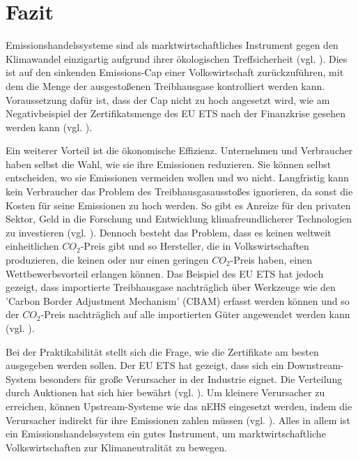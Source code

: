 \chapter{Fazit}

Emissionshandelssysteme sind als marktwirtschaftliches Instrument gegen den Klimawandel einzigartig aufgrund ihrer ökologischen Treffsicherheit (vgl. \cite[S. 182]{hubert.2020}).
Dies ist auf den sinkenden Emissions-Cap einer Volkswirtschaft zurückzuführen, mit dem die Menge der ausgestoßenen Treibhausgase kontrolliert werden kann.
Voraussetzung dafür ist, dass der Cap nicht zu hoch angesetzt wird, wie am Negativbeispiel der Zertifikatsmenge des EU ETS nach der Finanzkrise gesehen werden kann (vgl. \cite{eu3.2023}).

Ein weiterer Vorteil ist die ökonomische Effizienz. Unternehmen und Verbraucher haben selbst die Wahl, wie sie ihre Emissionen reduzieren.
Sie können selbst entscheiden, wo sie Emissionen vermeiden wollen und wo nicht. Langfristig kann kein Verbraucher das Problem des Treibhausgasausstoßes ignorieren, da sonst die Kosten für seine Emissionen zu hoch werden.
So gibt es Anreize für den privaten Sektor, Geld in die Forschung und Entwicklung klimafreundlicherer Technologien zu investieren (vgl. \cite[S. 183]{hubert.2020}).
Dennoch besteht das Problem, dass es keinen weltweit einheitlichen $CO_2$-Preis gibt und so Hersteller, die in Volkswirtschaften produzieren, die keinen oder nur einen geringen $CO_2$-Preis haben, einen Wettbewerbsvorteil erlangen können.
Das Beispiel des EU ETS hat jedoch gezeigt, dass importierte Treibhausgase nachträglich über Werkzeuge wie den 'Carbon Border Adjustment Mechanism' (CBAM) erfasst werden können und so der $CO_2$-Preis nachträglich auf alle importierten Güter angewendet werden kann (vgl. \cite{ub.2023}).

Bei der Praktikabilität stellt sich die Frage, wie die Zertifikate am besten ausgegeben werden sollen. Der EU ETS hat gezeigt, dass sich ein Downstream-System besonders für große Verursacher in der Industrie eignet.
Die Verteilung durch Auktionen hat sich hier bewährt (vgl. \cite{eu.2024}). Um kleinere Verursacher zu erreichen, können Upstream-Systeme wie das nEHS eingesetzt werden, indem die Verursacher indirekt für ihre Emissionen zahlen müssen (vgl. \cite{dehst.2023}).
Alles in allem ist ein Emissionshandelssystem ein gutes Instrument, um marktwirtschaftliche Volkswirtschaften zur Klimaneutralität zu bewegen.